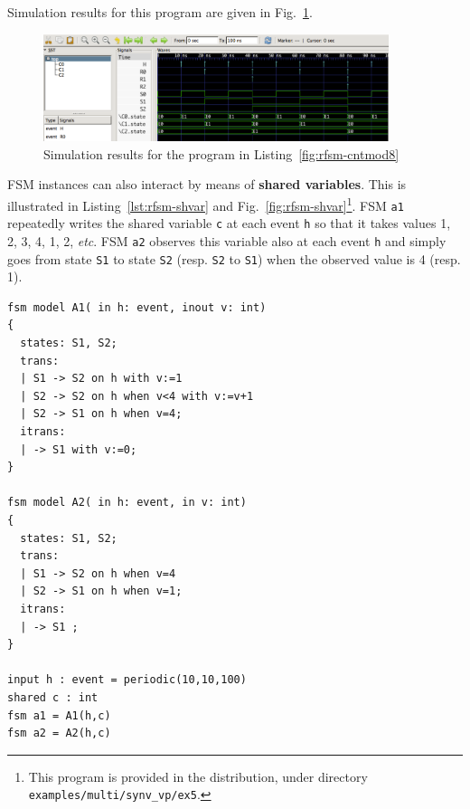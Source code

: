 \pagebreak
Simulation results for this program are given in Fig.~\ref{fig:rfsm-cntmod8-vcd}.

\begin{figure}
   \includegraphics[width=0.9\textwidth]{figs/ctrmod8-chrono}
   \centering
  \caption{Simulation results for the program in Listing~\ref{fig:rfsm-cntmod8}}
  \label{fig:rfsm-cntmod8-vcd}
\end{figure}

\bigskip FSM instances can also interact by means of \textbf{shared variables}. This is illustrated
in Listing~\ref{lst:rfsm-shvar} and Fig.~\ref{fig:rfsm-shvar}\footnote{This program is provided in
  the distribution, under directory \texttt{examples/multi/synv_vp/ex5}.}. FSM \texttt{a1}
repeatedly writes the shared variable \texttt{c} at each event \texttt{h} so that it takes values 1,
2, 3, 4, 1, 2, \emph{etc}. FSM \texttt{a2} observes this variable also at each event \texttt{h} and
simply goes from state \texttt{S1} to state \texttt{S2} (resp. \texttt{S2} to \texttt{S1}) when the
observed value is 4 (resp. 1).

\begin{lstlisting}[frame=single,language=Rfsm,caption={A program involving two FSM instances and a
    shared variable},label={lst:rfsm-shvar}]
fsm model A1( in h: event, inout v: int)
{
  states: S1, S2;
  trans:
  | S1 -> S2 on h with v:=1
  | S2 -> S2 on h when v<4 with v:=v+1
  | S2 -> S1 on h when v=4;
  itrans:
  | -> S1 with v:=0;
}

fsm model A2( in h: event, in v: int)
{
  states: S1, S2;
  trans:
  | S1 -> S2 on h when v=4
  | S2 -> S1 on h when v=1;
  itrans:
  | -> S1 ;
}

input h : event = periodic(10,10,100)
shared c : int
fsm a1 = A1(h,c)
fsm a2 = A2(h,c)
\end{lstlisting}

